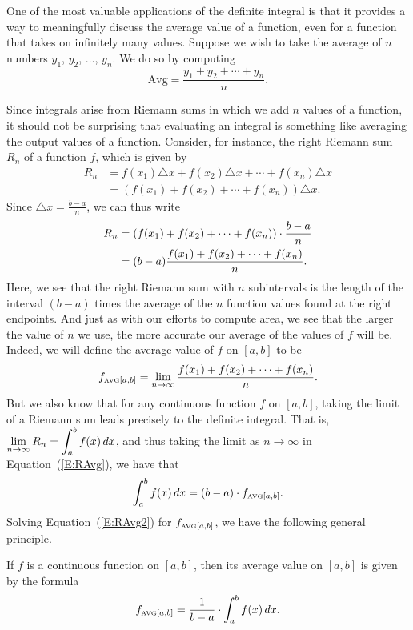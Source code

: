 One of the most valuable applications of the definite integral is that it provides a way to meaningfully discuss the average value of a function, even for a function that takes on infinitely many values.  Suppose we wish to take the average of $n$ numbers $y_1$, $y_2$, $\ldots$, $y_n$.  We do so by computing
\[ \mbox{Avg} = \frac{y_1 + y_2 + \cdots + y_n}{n}. \]

Since integrals arise from Riemann sums in which we add $n$ values of a function, it should not be surprising that evaluating an integral is something like averaging the output values of a function.  Consider, for instance, the right Riemann sum $R_n$ of a function $f$, which is given by
\begin{align*}
R_n & = f(x_1) \triangle x + f(x_2) \triangle x + \cdots + f(x_n) \triangle x \\
& = \left( f(x_1) + f(x_2) + \cdots + f(x_n) \right) \triangle x.
\end{align*}
Since $\triangle x = \frac{b-a}{n}$, we can thus write 
\begin{align} \label{E:RAvg}
R_n &  = (f(x_1) + f(x_2) + \cdots + f(x_n))\cdot \frac{b-a}{n} \notag \\
& = (b-a) \frac{f(x_1) + f(x_2) + \cdots + f(x_n)}{n}.
\end{align}
Here, we see that the right Riemann sum with $n$ subintervals is the length of the interval $(b-a)$ times the average of the $n$ function values found at the right endpoints.  And just as with our efforts to compute area, we see that the larger the value of $n$ we use, the more accurate our average of the values of $f$ will be.  Indeed, we will define the average value of $f$ on $[a,b]$ to be 
\[ f_{\mbox{\tiny{AVG}}[a,b]} = \lim_{n \to \infty} \frac{f(x_1) + f(x_2) + \cdots + f(x_n)}{n}.\]  
But we also know that for any continuous function $f$ on $[a,b]$, taking the limit of a Riemann sum leads precisely to the definite integral.  That is, $\displaystyle \lim_{n \to \infty} R_n = \int_a^b f(x) \, dx$, and thus taking the limit as $n \to \infty$ in Equation~(\ref{E:RAvg}), we have that
\begin{equation} \label{E:RAvg2} %
\int_a^b f(x) \, dx = (b-a) \cdot f_{\mbox{\tiny{AVG}}[a,b]}.
\end{equation}
Solving Equation~(\ref{E:RAvg2}) for $f_{\mbox{\tiny{AVG}}[a,b]}$, we have the following general principle.

{If $f$ is a continuous function on $[a,b]$, then its average value on $[a,b]$ is given by the formula
\[ f_{\mbox{\tiny{AVG}}[a,b]} = \frac{1}{b-a} \cdot \int_a^b f(x) \, dx. \]
} %

